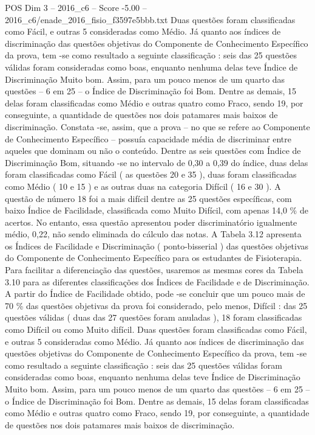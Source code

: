 \begin{textsample}{POS Dim 3 – 2016\_c6 – Score -5.00 – 2016\_c6/enade\_2016\_fisio\_f3597e5bbb.txt}
Duas questões foram classificadas como Fácil, e outras 5 consideradas como Médio.
Já quanto aos índices de discriminação das questões objetivas do Componente de Conhecimento Específico da prova, tem -se como resultado a seguinte classificação : seis das 25 questões válidas foram consideradas como boas, enquanto nenhuma delas teve Índice de Discriminação Muito bom.
Assim, para um pouco menos de um quarto das questões – 6 em 25 – o Índice de Discriminação foi Bom.
Dentre as demais, 15 delas foram classificadas como Médio e outras quatro como Fraco, sendo 19, por conseguinte, a quantidade de questões nos dois patamares mais baixos de discriminação.
Constata -se, assim, que a prova – no que se refere ao Componente de Conhecimento Específico – possuía capacidade média de discriminar entre aqueles que dominam ou não o conteúdo.
Dentre as seis questões com Índice de Discriminação Bom, situando -se no intervalo de 0,30 a 0,39 do índice, duas delas foram classificadas como Fácil ( as questões 20 e 35 ), duas foram classificadas como Médio ( 10 e 15 ) e as outras duas na categoria Difícil ( 16 e 30 ).
A questão de número 18 foi a mais difícil dentre as 25 questões específicas, com baixo Índice de Facilidade, classificada como Muito Difícil, com apenas 14,0 \% de acertos.
No entanto, essa questão apresentou poder discriminatório igualmente médio, 0,22, não sendo eliminada do cálculo das notas.
A Tabela 3.12 apresenta os Índices de Facilidade e Discriminação ( ponto-bisserial ) das questões objetivas do Componente de Conhecimento Específico para os estudantes de Fisioterapia.
Para facilitar a diferenciação das questões, usaremos as mesmas cores da Tabela 3.10 para as diferentes classificações dos Índices de Facilidade e de Discriminação.
A partir do Índice de Facilidade obtido, pode -se concluir que um pouco mais de 70 \% das questões objetivas da prova foi considerado, pelo menos, Difícil : das 25 questões válidas ( duas das 27 questões foram anuladas ), 18 foram classificadas como Difícil ou como Muito difícil.
Duas questões foram classificadas como Fácil, e outras 5 consideradas como Médio.
Já quanto aos índices de discriminação das questões objetivas do Componente de Conhecimento Específico da prova, tem -se como resultado a seguinte classificação : seis das 25 questões válidas foram consideradas como boas, enquanto nenhuma delas teve Índice de Discriminação Muito bom.
Assim, para um pouco menos de um quarto das questões – 6 em 25 – o Índice de Discriminação foi Bom.
Dentre as demais, 15 delas foram classificadas como Médio e outras quatro como Fraco, sendo 19, por conseguinte, a quantidade de questões nos dois patamares mais baixos de discriminação.

\end{textsample}

